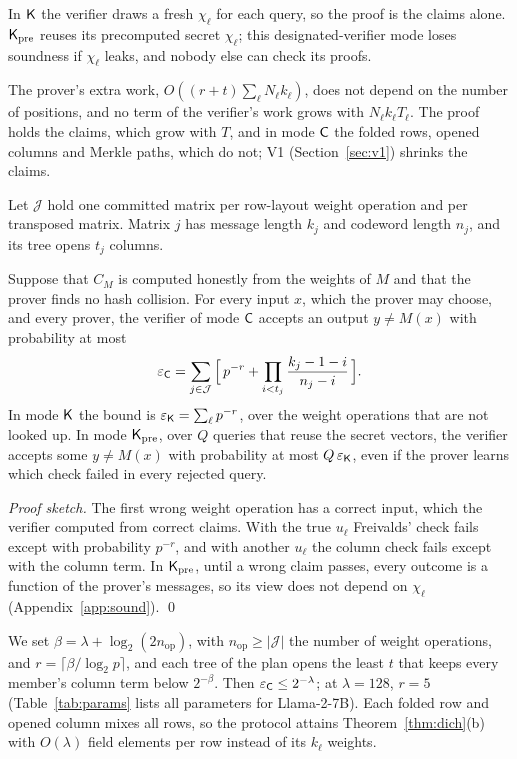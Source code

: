  In $\mathsf{K}$ the verifier draws a fresh $\chi_\ell$ for each query, so
the proof is the claims alone. $\mathsf{K}_{\mathrm{pre}}$ reuses its precomputed secret $\chi_\ell$; this
designated-verifier mode loses soundness if $\chi_\ell$ leaks, and nobody else can check its proofs.

 The prover's extra work, $O((r+t)\sum_\ell N_\ell k_\ell)$, does not depend on the
number of positions, and no term of the verifier's work grows with $N_\ell k_\ell T_\ell$. The proof
holds the claims, which grow with $T$, and in mode $\mathsf{C}$ the folded rows, opened columns and Merkle
paths, which do not; V1 (Section~\ref{sec:v1}) shrinks the claims.

 Let $\mathcal J$ hold one committed matrix per row-layout weight operation and per
transposed matrix. Matrix $j$ has message length $k_j$ and codeword length $n_j$, and its tree opens
$t_j$ columns.

\begin{theorem}[soundness]
\label{thm:sound}
Suppose that $C_M$ is computed honestly from the weights of $M$ and that the prover finds no hash
collision. For every input $x$, which the prover may choose, and every prover, the verifier of mode
$\mathsf{C}$ accepts an output $y\neq M(x)$ with probability at most
\[
  \varepsilon_{\mathsf{C}}=\sum_{j\in\mathcal J}\Big[\,p^{-r}+\prod_{i<t_j}\frac{k_j-1-i}{n_j-i}\,\Big].
\]
In mode $\mathsf{K}$ the bound is $\varepsilon_{\mathsf{K}}=\sum_\ell p^{-r}$, over the weight operations that
are not looked up. In mode $\mathsf{K}_{\mathrm{pre}}$, over $Q$ queries that reuse the secret vectors, the verifier
accepts some $y\neq M(x)$ with probability at most $Q\,\varepsilon_{\mathsf{K}}$, even if the prover learns
which check failed in every rejected query.
\end{theorem}

\noindent\emph{Proof sketch.} The first wrong weight operation has a correct input, which the
verifier computed from correct claims. With the true $u_\ell$ Freivalds' check fails except with
probability $p^{-r}$, and with another $u_\ell$ the column check fails except with the column term.
In $\mathsf{K}_{\mathrm{pre}}$, until a wrong claim passes, every outcome is a function of the prover's messages, so its
view does not depend on $\chi_\ell$ (Appendix~\ref{app:sound}). \qed

 We set $\beta=\lambda+\log_2(2n_{\mathrm{op}})$, with $n_{\mathrm{op}}\ge|\mathcal J|$
the number of weight operations, and $r=\lceil\beta/\log_2p\rceil$, and each tree of the plan opens the least
$t$ that keeps every member's column term below $2^{-\beta}$. Then
$\varepsilon_{\mathsf{C}}\le2^{-\lambda}$; at $\lambda=128$, $r=5$ (Table~\ref{tab:params} lists all
parameters for Llama-2-7B). Each folded row and opened column mixes all rows, so the protocol attains
Theorem~\ref{thm:dich}(b) with $O(\lambda)$ field elements per row instead of its $k_\ell$ weights.

